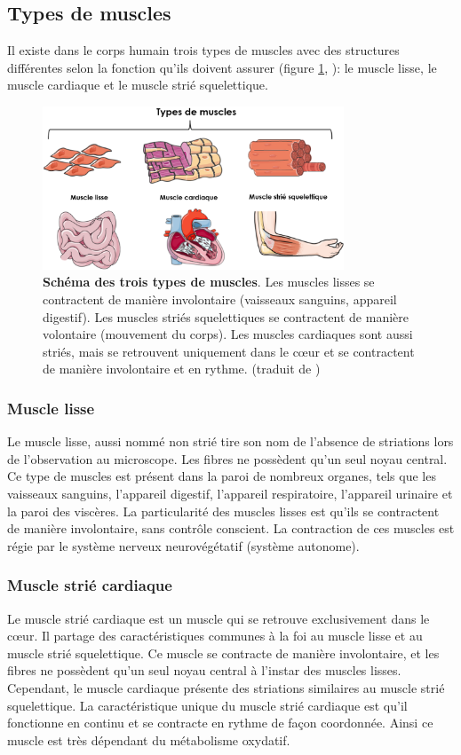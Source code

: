 \subsection{Types de muscles}
Il existe dans le corps humain trois types de muscles avec des structures différentes selon la fonction qu'ils doivent assurer (figure \ref{fig:muscle-type}, \cite{gomez_oca_physiological_2021}): le muscle lisse, le muscle cardiaque et le muscle strié squelettique.
\begin{figure}[!ht]
 \centering
 \includegraphics[width=0.8\textwidth]{figures/muscle_type.png}
 \caption[Schéma des trois types de muscles]{\textbf{Schéma des trois types de muscles}. Les muscles lisses se contractent de manière involontaire (vaisseaux sanguins, appareil digestif). Les muscles striés squelettiques se contractent de manière volontaire (mouvement du corps). Les muscles cardiaques sont aussi striés, mais se retrouvent uniquement dans le cœur et se contractent de manière involontaire et en rythme.  (traduit de \cite{gomez_oca_physiological_2021})}
 \label{fig:muscle-type}
\end{figure}
\subsubsection{Muscle lisse}
Le muscle lisse, aussi nommé non strié tire son nom de l'absence de striations lors de l'observation au microscope. Les fibres ne possèdent qu'un seul noyau central. Ce type de muscles est présent dans la paroi de nombreux organes, tels que les vaisseaux sanguins, l'appareil digestif, l'appareil respiratoire, l'appareil urinaire et la paroi des viscères. La particularité des muscles lisses est qu'ils se contractent de manière involontaire, sans contrôle conscient. La contraction de ces muscles est régie par le système nerveux neurovégétatif (système autonome).

\subsubsection{Muscle strié cardiaque}
Le muscle strié cardiaque est un muscle qui se retrouve exclusivement dans le cœur. Il partage des caractéristiques communes à la foi au muscle lisse et au muscle strié squelettique. Ce muscle se contracte de manière involontaire, et les fibres ne possèdent qu'un seul noyau central à l'instar des muscles lisses. Cependant, le muscle cardiaque présente des striations similaires au muscle strié squelettique. La caractéristique unique du muscle strié cardiaque est qu'il fonctionne en continu et se contracte en rythme de façon coordonnée. Ainsi ce muscle est très dépendant du métabolisme oxydatif.

